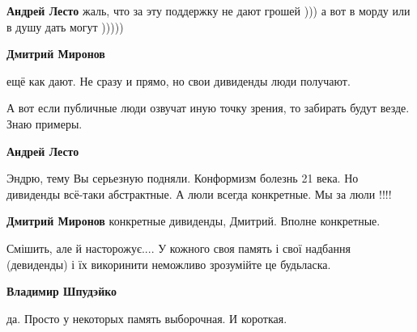 \begin{itemize}
\begin{itemize}
\textbf{Андрей Лесто} жаль, что за эту поддержку не дают грошей ))) а вот в морду или в душу дать могут )))))

 
\textbf{Дмитрий Миронов} 

ещё как дают. Не сразу и прямо, но свои дивиденды люди получают.

А вот если публичные люди озвучат иную точку зрения, то забирать будут везде.
Знаю примеры.


 
\textbf{Андрей Лесто} 

Эндрю, тему Вы серьезную подняли. Конформизм болезнь 21 века. Но дивиденды
всё-таки абстрактные. А люли всегда конкретные. Мы за люли !!!!

 
\textbf{Дмитрий Миронов} конкретные дивиденды, Дмитрий. Вполне конкретные.

 
Смішить, але й насторожує.... У кожного своя память і свої надбання (девиденды)
і їх викоринити неможливо зрозумійте це будьласка.


 
\textbf{Владимир Шпудэйко} 

да. Просто у некоторых память выборочная. И короткая.


\end{itemize}
\end{itemize}
